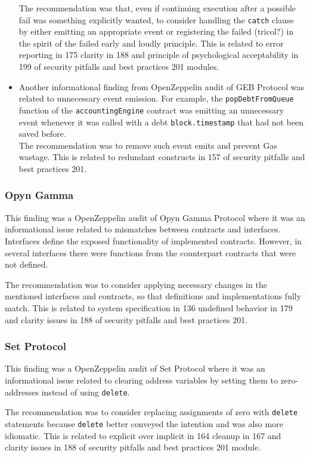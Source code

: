 \begin{itemize}
  The recommendation was that, even if continuing execution after a
  possible fail was something explicitly wanted, to consider handling
  the \texttt{catch} clause by either emitting an appropriate event or
  registering the failed (tricol?) in the spirit of the failed early and
  loudly principle. This is related to error reporting in 175 clarity in
  188 and principle of psychological acceptability in 199 of security
  pitfalls and best practices 201 modules.
\item
  Another informational finding from OpenZeppelin audit of GEB Protocol
  was related to unnecessary event emission. For example, the
  \texttt{popDebtFromQueue} function of the \texttt{accountingEngine}
  contract was emitting an unnecessary event whenever it was called with
  a debt \texttt{block.timestamp} that had not been saved before.\\

  The recommendation was to remove such event emits and prevent Gas
  wastage. This is related to redundant constructs in 157 of security
  pitfalls and best practices 201.
\end{itemize}

\subsubsection{Opyn Gamma}\label{opyn-gamma}

This finding was a OpenZeppelin audit of Opyn Gamma Protocol where it
was an informational issue related to mismatches between contracts and
interfaces. Interfaces define the exposed functionality of implemented
contracts. However, in several interfaces there were functions from the
counterpart contracts that were not defined.

The recommendation was to consider applying necessary changes in the
mentioned interfaces and contracts, so that definitions and
implementations fully match. This is related to system specification in
136 undefined behavior in 179 and clarity issues in 188 of security
pitfalls and best practices 201.

\subsubsection{Set Protocol}\label{set-protocol}

This finding was a OpenZeppelin audit of Set Protocol where it was an
informational issue related to clearing address variables by setting
them to zero-addresses instead of using \texttt{delete}.

The recommendation was to consider replacing assignments of zero with
\texttt{delete} statements because \texttt{delete} better conveyed the
intention and was also more idiomatic. This is related to explicit over
implicit in 164 cleanup in 167 and clarity issues in 188 of security
pitfalls and best practices 201 module.
